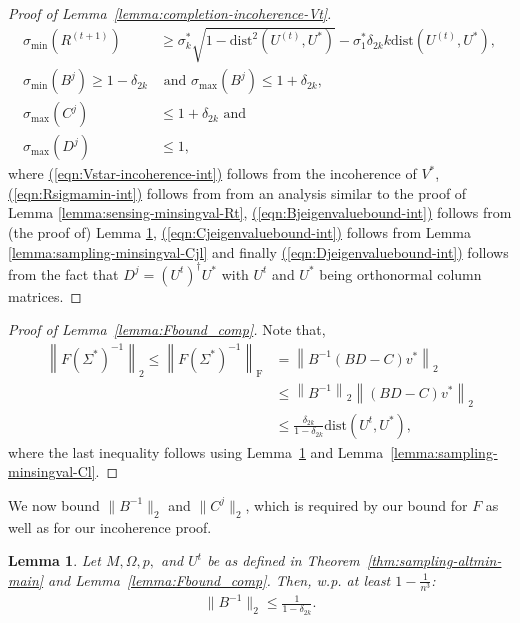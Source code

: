 \documentclass[11pt]{article}
\renewcommand{\eqref}[1]{\hyperref[#1]{(\ref*{#1})}}
\theoremstyle{plain}
\newtheorem{lemma}[theorem]{Lemma}
\theoremstyle{definition}
\newcommand{\dist}{\mathrm{dist}}
\newcommand{\frob}[1]{\left\| {#1} \right\|_\text{F}}
\newcommand{\twonorm}[1]{\left\| {#1} \right\|_2}
\newcommand{\Ut}{U^{t}}
\newcommand{\Vo}{V^*}
\newcommand{\Uo}{U^*}
\begin{document}
\begin{proof}[Proof of Lemma~\ref{lemma:completion-incoherence-Vt}]
\begin{align}
  \sigma_{\textrm{min}}\left(R^{(t+1)}\right) &\geq 
	\sigma^*_k\sqrt{1-\dist^2\left(U^{(t)},U^*\right)}-\sigma^*_1 \delta_{2k}k\dist(U^{(t)},U^*),
		\label{eqn:Rsigmamin-int} \\
  \sigma_{\textrm{min}}\left(B^j\right) \geq 1-\delta_{2k} &\mbox{ and }
	\sigma_{\textrm{max}}\left(B^j\right) \leq 1+\delta_{2k}, \label{eqn:Bjeigenvaluebound-int} \\
  \sigma_{\textrm{max}}\left(C^j\right) &\leq 1+\delta_{2k} \mbox{ and } \label{eqn:Cjeigenvaluebound-int} \\
  \sigma_{\textrm{max}}\left(D^j\right) &\leq 1, \label{eqn:Djeigenvaluebound-int}
\end{align}
where
\eqref{eqn:Vstar-incoherence-int} follows from the incoherence of $\Vo$,
\eqref{eqn:Rsigmamin-int} follows from from an analysis similar to the proof of Lemma \ref{lemma:sensing-minsingval-Rt},
\eqref{eqn:Bjeigenvaluebound-int} follows from (the proof of) Lemma \ref{lemma:sampling-minsingval-Bl},
\eqref{eqn:Cjeigenvaluebound-int} follows from Lemma \ref{lemma:sampling-minsingval-Cjl} and finally
\eqref{eqn:Djeigenvaluebound-int} follows from the fact that $D^j = \left(U^t\right)^{\dag}U^*$ with
$U^t$ and $U^*$ being orthonormal column matrices.
\end{proof}
\begin{proof}[Proof of Lemma~\ref{lemma:Fbound_comp}]
  Note that,
\begin{align}
  \twonorm{F(\Sigma^*)^{-1}} \leq \frob{F(\Sigma^*)^{-1}} &= \twonorm{B^{-1} \left(BD-C\right)v^*} \nonumber\\
	&\leq \twonorm{B^{-1}}\twonorm{(BD-C)v^*} \nonumber\\
	&\leq \frac{\delta_{2k}}{1-\delta_{2k}}\dist(\Ut, \Uo),   \label{eqn:sampling-twonorm-F-1}
\end{align}
where the last inequality follows using Lemma~\ref{lemma:sampling-minsingval-Bl} and Lemma~\ref{lemma:sampling-minsingval-Cl}. 
\end{proof}
We now bound $\|B^{-1}\|_2$ and $\|C^j\|_2$, which is required by our bound for $F$ as well as for our incoherence proof. 
\begin{lemma}\label{lemma:sampling-minsingval-Bl}
Let $M, \Omega, p,$ and $\Ut$ be as defined in Theorem~\ref{thm:sampling-altmin-main} and Lemma~\ref{lemma:Fbound_comp}. 
Then, w.p. at least $1-\frac{1}{n^3}$: 
\begin{align}\label{eqn:sampling-minsingval-Bl}
\|B^{-1}\|_2\leq \frac{1}{1-\delta_{2k}}.
\end{align}
\end{lemma}
\end{document}
